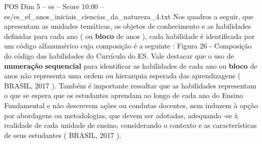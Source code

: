 \begin{textsample}{POS Dim 5 – es – Score 10.00 – es/es\_ef\_anos\_iniciais\_ciencias\_da\_natureza\_4.txt}
Nos quadros a seguir, que apresentam as unidades temáticas, os objetos de conhecimento e as habilidades definidas para cada ano ( ou \textbf{bloco} de anos ), cada habilidade é identificada por um código alfanumérico cuja composição é a seguinte : Figura 26 - Composição do código das habilidades do Currículo do ES.
Vale destacar que o uso de \textbf{numeração} \textbf{sequencial} para identificar as habilidades de cada ano ou \textbf{bloco} de anos não representa uma ordem ou hierarquia esperada das aprendizagens ( BRASIL, 2017 ).
Também é importante ressaltar que as habilidades representam o que se espera que os estudantes aprendam ao longo de cada ano do Ensino Fundamental e não descrevem ações ou condutas docentes, nem induzem à opção por abordagens ou metodologias, que devem ser adotadas, adequando -se à realidade de cada unidade de ensino, considerando o contexto e as características de seus estudantes ( BRASIL, 2017 ).

\end{textsample}
